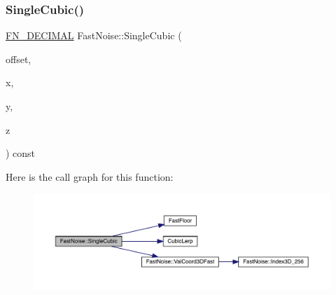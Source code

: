 \subsubsection{\texorpdfstring{Single\+Cubic()}{SingleCubic()}\hspace{0.1cm}{\footnotesize\ttfamily [2/2]}}
{\footnotesize\ttfamily \mbox{\hyperlink{_fast_noise_8h_a75a9ef6d2541c4921815b885bfd449c3}{F\+N\+\_\+\+D\+E\+C\+I\+M\+AL}} Fast\+Noise\+::\+Single\+Cubic (\begin{DoxyParamCaption}\item[{unsigned char}]{offset,  }\item[{\mbox{\hyperlink{_fast_noise_8h_a75a9ef6d2541c4921815b885bfd449c3}{F\+N\+\_\+\+D\+E\+C\+I\+M\+AL}}}]{x,  }\item[{\mbox{\hyperlink{_fast_noise_8h_a75a9ef6d2541c4921815b885bfd449c3}{F\+N\+\_\+\+D\+E\+C\+I\+M\+AL}}}]{y,  }\item[{\mbox{\hyperlink{_fast_noise_8h_a75a9ef6d2541c4921815b885bfd449c3}{F\+N\+\_\+\+D\+E\+C\+I\+M\+AL}}}]{z }\end{DoxyParamCaption}) const\hspace{0.3cm}{\ttfamily [private]}}

Here is the call graph for this function\+:
\nopagebreak
\begin{figure}[H]
\begin{center}
\leavevmode
\includegraphics[width=350pt]{class_fast_noise_a916d50d82702accf7842f5376619560e_cgraph}
\end{center}
\end{figure}
\mbox{\label{class_fast_noise_a679b755d2540f9c26cb1d978f92fbef2}} 
